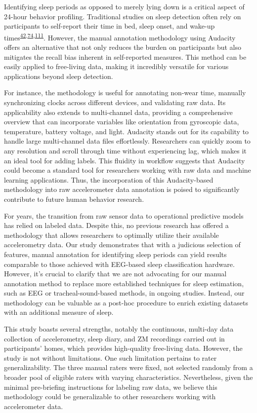 \documentclass[
  10pt,
]{scrbook}
\begin{document}
Identifying sleep periods as opposed to merely lying down is a critical
aspect of 24-hour behavior profiling. Traditional studies on sleep
detection often rely on participants to self-report their time in bed,
sleep onset, and wake-up
times\textsuperscript{\protect\hyperlink{ref-girschik_validation_2012}{42},\protect\hyperlink{ref-littner_2003}{74},\protect\hyperlink{ref-lockley_1999}{111}}.
However, the manual annotation methodology using Audacity offers an
alternative that not only reduces the burden on participants but also
mitigates the recall bias inherent in self-reported measures. This
method can be easily applied to free-living data, making it incredibly
versatile for various applications beyond sleep detection.

For instance, the methodology is useful for annotating non-wear time,
manually synchronizing clocks across different devices, and validating
raw data. Its applicability also extends to multi-channel data,
providing a comprehensive overview that can incorporate variables like
orientation from gyroscopic data, temperature, battery voltage, and
light. Audacity stands out for its capability to handle large
multi-channel data files effortlessly. Researchers can quickly zoom to
any resolution and scroll through time without experiencing lag, which
makes it an ideal tool for adding labels. This fluidity in workflow
suggests that Audacity could become a standard tool for researchers
working with raw data and machine learning applications. Thus, the
incorporation of this Audacity-based methodology into raw accelerometer
data annotation is poised to significantly contribute to future human
behavior research.

For years, the transition from raw sensor data to operational predictive
models has relied on labeled data. Despite this, no previous research
has offered a methodology that allows researchers to optimally utilize
their available accelerometry data. Our study demonstrates that with a
judicious selection of features, manual annotation for identifying sleep
periods can yield results comparable to those achieved with EEG-based
sleep classification hardware. However, it's crucial to clarify that we
are not advocating for our manual annotation method to replace more
established techniques for sleep estimation, such as EEG or
tracheal-sound-based methods, in ongoing studies. Instead, our
methodology can be valuable as a post-hoc procedure to enrich existing
datasets with an additional measure of sleep.

This study boasts several strengths, notably the continuous, multi-day
data collection of accelerometry, sleep diary, and ZM recordings carried
out in participants' homes, which provides high-quality free-living
data. However, the study is not without limitations. One such limitation
pertains to rater generalizability. The three manual raters were fixed,
not selected randomly from a broader pool of eligible raters with
varying characteristics. Nevertheless, given the minimal pre-briefing
instructions for labeling raw data, we believe this methodology could be
generalizable to other researchers working with accelerometer data.
\end{document}
